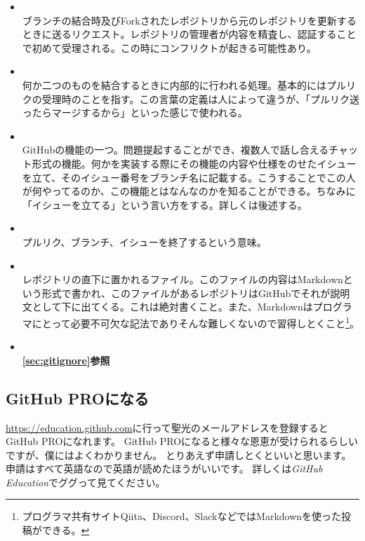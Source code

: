 \documentclass[a4paper]{ltjsreport}
\begin{document}
\begin{itemize}
  \item {}\\
        ブランチの結合時及びForkされたレポジトリから元のレポジトリを更新するときに送るリクエスト。レポジトリの管理者が内容を精査し、認証することで初めて受理される。この時にコンフリクトが起きる可能性あり。
  \item {}\\
        何か二つのものを結合するときに内部的に行われる処理。基本的にはプルリクの受理時のことを指す。この言葉の定義は人によって違うが、「プルリク送ったらマージするから」といった感じで使われる。
  \item {}\\
        GitHubの機能の一つ。問題提起することができ、複数人で話し合えるチャット形式の機能。何かを実装する際にその機能の内容や仕様をのせたイシューを立て、そのイシュー番号をブランチ名に記載する。こうすることでこの人が何やってるのか、この機能とはなんなのかを知ることができる。ちなみに「イシューを立てる」という言い方をする。詳しくは後述する。
  \item {}\\
        プルリク、ブランチ、イシューを終了するという意味。
  \item {}\\
        レポジトリの直下に置かれるファイル。このファイルの内容はMarkdownという形式で書かれ、このファイルがあるレポジトリはGitHubでそれが説明文として下に出てくる。これは絶対書くこと。また、Markdownはプログラマにとって必要不可欠な記法でありそんな難しくないので習得しとくこと\footnote{プログラマ共有サイトQiita、Discord、SlackなどではMarkdownを使った投稿ができる。}。
  \item {}\\
        {\bfseries\ref{sec:gitignore}参照}
\end{itemize}


\subsection{GitHub PROになる}
\url{https://education.github.com}に行って聖光のメールアドレスを登録するとGitHub PROになれます。
GitHub PROになると様々な恩恵が受けられるらしいですが、僕にはよくわかりません。
とりあえず申請しとくといいと思います。
申請はすべて英語なので英語が読めたほうがいいです。
詳しくは\emph{GitHub Education}でググって見てください。
\end{document}
